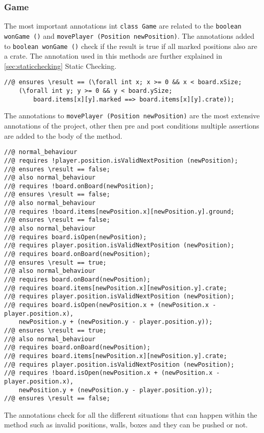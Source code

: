 \documentclass[a4paper]{article}
\begin{document}
	\subsubsection{Game}
	The most important annotations int \texttt{class Game} are related to the \texttt{boolean wonGame ()} and \texttt{movePlayer (Position newPosition)}. The annotations added to \texttt{boolean wonGame ()} check if the result is true if all marked positions also are a crate. The annotation used in this methods are further explained in \ref{sec:staticchecking} Static Checking.
	\begin{lstlisting}
//@ ensures \result == (\forall int x; x >= 0 && x < board.xSize; 
	(\forall int y; y >= 0 && y < board.ySize;
		board.items[x][y].marked ==> board.items[x][y].crate));
	\end{lstlisting}
	The annotations to \texttt{movePlayer (Position newPosition)} are the most extensive annotations of the project, other then pre and post conditions multiple assertions are added to the body of the method.
	\begin{lstlisting}
//@ normal_behaviour
//@ requires !player.position.isValidNextPosition (newPosition);
//@ ensures \result == false;
//@ also normal_behaviour
//@ requires !board.onBoard(newPosition);
//@ ensures \result == false;
//@ also normal_behaviour
//@ requires !board.items[newPosition.x][newPosition.y].ground;
//@ ensures \result == false;
//@ also normal_behaviour
//@ requires board.isOpen(newPosition);
//@ requires player.position.isValidNextPosition (newPosition);
//@ requires board.onBoard(newPosition);
//@ ensures \result == true;
//@ also normal_behaviour
//@ requires board.onBoard(newPosition);
//@ requires board.items[newPosition.x][newPosition.y].crate;
//@ requires player.position.isValidNextPosition (newPosition);
//@ requires board.isOpen(newPosition.x + (newPosition.x - player.position.x), 
	newPosition.y + (newPosition.y - player.position.y));
//@ ensures \result == true;
//@ also normal_behaviour
//@ requires board.onBoard(newPosition);
//@ requires board.items[newPosition.x][newPosition.y].crate;
//@ requires player.position.isValidNextPosition (newPosition);
//@ requires !board.isOpen(newPosition.x + (newPosition.x - player.position.x), 
	newPosition.y + (newPosition.y - player.position.y));
//@ ensures \result == false;
	\end{lstlisting}
	The annotations check for all the different situations that can happen within the method such as invalid positions, walls, boxes and they can be pushed or not.
	
\end{document}
